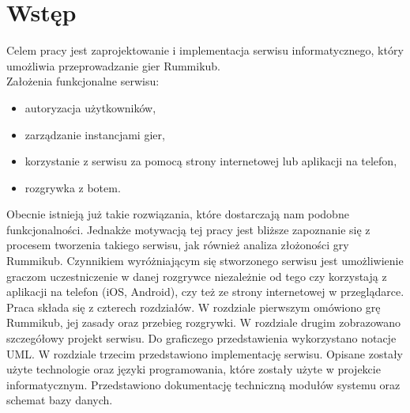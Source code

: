 \chapter*{Wstęp}

\thispagestyle{chapterBeginStyle}

Celem pracy jest zaprojektowanie i implementacja serwisu informatycznego, który umożliwia przeprowadzanie gier Rummikub.
\\

Założenia funkcjonalne serwisu:
	\begin{itemize}
		\item autoryzacja użytkowników,
		\item zarządzanie instancjami gier,
		\item korzystanie z serwisu za pomocą strony internetowej lub aplikacji na telefon,
		\item rozgrywka z botem. \\
	\end{itemize} 

Obecnie istnieją już takie rozwiązania, które dostarczają nam podobne funkcjonalności. Jednakże motywacją tej pracy jest bliższe zapoznanie się z procesem tworzenia takiego serwisu, jak również analiza złożoności gry Rummikub. Czynnikiem wyróżniającym się stworzonego serwisu jest umożliwienie graczom uczestniczenie w danej rozgrywce niezależnie od tego czy korzystają z aplikacji na telefon (iOS, Android), czy też ze strony internetowej w przeglądarce. \\

Praca składa się z czterech rozdziałów. W rozdziale pierwszym omówiono grę Rummikub, jej zasady oraz przebieg rozgrywki. W rozdziale drugim zobrazowano szczegółowy projekt serwisu. Do graficzego przedstawienia wykorzystano notacje UML. W rozdziale trzecim przedstawiono implementację serwisu. Opisane zostały użyte technologie oraz języki programowania, które zostały użyte w projekcie informatycznym. Przedstawiono dokumentację techniczną modułów systemu oraz schemat bazy danych.